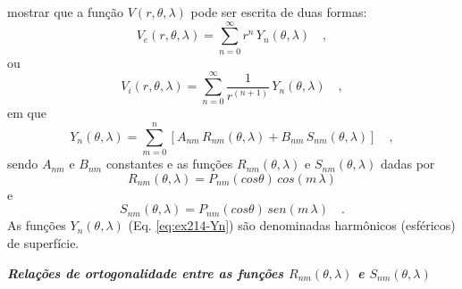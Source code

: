 \documentclass[10pt,a4paper,fleqn]{article}
\begin{document}
mostrar que a funç\~{a}o $V(r,\theta,\lambda)$ pode ser escrita de duas formas:
\begin{equation}
V_{e}(r,\theta,\lambda) = \sum_{n=0}^{\infty} r^{n} \, 
Y_{n}(\theta, \lambda) \quad ,
\label{eq:ex214-ve}
\end{equation}
ou
\begin{equation}
V_{i}(r,\theta,\lambda) = \sum_{n=0}^{\infty} \frac{1}{r^{(n+1)}} \,
Y_{n}(\theta, \lambda) \quad ,
\label{eq:ex214-vi}
\end{equation}
em que 
\begin{equation}
Y_{n}(\theta, \lambda) = \sum_{m=0}^{n} 
\left[ 
A_{nm} \, R_{nm}(\theta, \lambda) +
B_{nm} \, S_{nm}(\theta, \lambda)
\right] \quad ,
\label{eq:ex214-Yn}
\end{equation}
sendo $A_{nm}$ e $B_{nm}$ constantes e as funç\~{o}es $R_{nm}(\theta, \lambda)$ e $S_{nm}(\theta, \lambda)$ dadas por
\begin{equation}
R_{nm}(\theta, \lambda) = P_{nm}(cos\theta) \, cos(m \, \lambda)
\label{eq:ex214-rnm}
\end{equation}
e
\begin{equation}
S_{nm}(\theta, \lambda) = P_{nm}(cos\theta) \, sen(m \, \lambda) \quad .
\label{eq:ex214-snm}
\end{equation}
As funç\~{o}es $Y_{n}(\theta, \lambda)$ (Eq. \ref{eq:ex214-Yn}) s\~{a}o denominadas harm\^{o}nicos (esf\'{e}ricos) de superf\'{i}cie.

\bigskip
\bigskip

\begin{flushleft}
\emph{\textbf{Relaç\~{o}es de ortogonalidade entre as funç\~{o}es $R_{nm}(\theta, \lambda)$ e $S_{nm}(\theta, \lambda)$}}
\end{flushleft}

\bigskip
\bigskip
\end{document}
